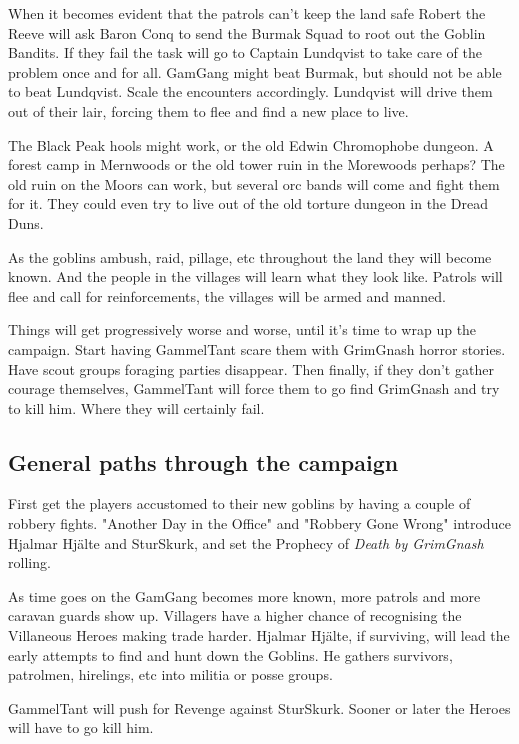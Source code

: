 When it becomes evident that the patrols can't keep the land safe Robert the Reeve will ask Baron Conq to send the Burmak Squad to root out the Goblin Bandits. If they fail the task will go to Captain Lundqvist to take care of the problem once and for all. GamGang might beat Burmak, but should not be able to beat Lundqvist. Scale the encounters accordingly. Lundqvist will drive them out of their lair, forcing them to flee and find a new place to live.

The Black Peak hools might work, or the old Edwin Chromophobe dungeon. A forest camp in Mernwoods or the old tower ruin in the Morewoods perhaps? The old ruin on the Moors can work, but several orc bands will come and fight them for it. They could even try to live out of the old torture dungeon in the Dread Duns.

As the goblins ambush, raid, pillage, etc throughout the land they will become known. And the people in the villages will learn what they look like.  Patrols will flee and call for reinforcements, the villages will be armed and manned.

Things will get progressively worse and worse, until it's time to wrap up the campaign. Start having GammelTant scare them with GrimGnash horror stories. Have scout groups foraging parties disappear. Then finally, if they don't gather courage themselves, GammelTant will force them to go find GrimGnash and try to kill him. Where they will certainly fail.


\subsection*{General paths through the campaign}

First get the players accustomed to their new goblins by having a couple of robbery fights. "Another Day in the Office" and "Robbery Gone Wrong" introduce Hjalmar Hjälte and SturSkurk, and set the Prophecy of \emph{Death by GrimGnash} rolling.

As time goes on the GamGang becomes more known, more patrols and more caravan guards show up. Villagers have a higher chance of recognising the Villaneous Heroes making trade harder. Hjalmar Hjälte, if surviving, will lead the early attempts to find and hunt down the Goblins. He gathers survivors, patrolmen, hirelings, etc into militia or posse groups.

GammelTant will push for Revenge against SturSkurk. Sooner or later the Heroes will have to go kill him.

